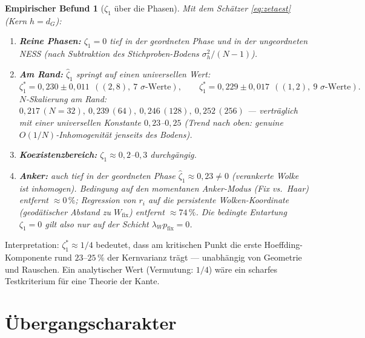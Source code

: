 \documentclass[11pt,a4paper]{article}
\newtheorem{befund}{Empirischer Befund}
\theoremstyle{remark}
\begin{document}
\begin{befund}[$\zeta_1$ über die Phasen]\label{bef:zeta}
Mit dem Schätzer \eqref{eq:zetaest} (Kern $h=d_G$):
\begin{enumerate}
\item \textbf{Reine Phasen:} $\zeta_1=0$ tief in der geordneten Phase und
in der ungeordneten NESS (nach Subtraktion des Stichproben-Bodens
$\sigma_h^2/(N-1)$).
\item \textbf{Am Rand:} $\widehat\zeta_1$ springt auf einen universellen Wert:
\[
\zeta_1^\ast = 0{,}230\pm0{,}011\ \ ((2,8),\ \text{7 }\sigma\text{-Werte}),
\qquad
\zeta_1^\ast = 0{,}229\pm0{,}017\ \ ((1,2),\ \text{9 }\sigma\text{-Werte}).
\]
$N$-Skalierung am Rand: $0{,}217\,(N{=}32),\ 0{,}239\,(64),\ 0{,}246\,(128),\ 0{,}252\,(256)$
--- verträglich mit einer universellen Konstante $0{,}23$--$0{,}25$
(Trend nach oben: genuine $O(1/N)$-Inhomogenität jenseits des Bodens).
\item \textbf{Koexistenzbereich:} $\zeta_1\approx0{,}2$--$0{,}3$ durchgängig.
\item \textbf{Anker:} auch tief in der geordneten Phase
$\widehat\zeta_1\approx0{,}23\neq0$ (verankerte Wolke ist inhomogen).
Bedingung auf den \emph{momentanen} Anker-Modus (Fix vs.\ Haar) entfernt
$\approx0\,\%$; Regression von $r_i$ auf die persistente Wolken-Koordinate
(geodätischer Abstand zu $W_{\mathrm{fix}}$) entfernt $\approx74\,\%$.
Die bedingte Entartung $\zeta_1=0$ gilt also \emph{nur} auf der Schicht
$\lambda_Wp_{\mathrm{fix}}=0$.
\end{enumerate}
\end{befund}

Interpretation: $\zeta_1^\ast\approx1/4$ bedeutet, dass am kritischen Punkt
die erste Hoeffding-Komponente rund $23$--$25\,\%$ der Kernvarianz trägt ---
unabhängig von Geometrie und Rauschen. Ein analytischer Wert (Vermutung:
$1/4$) wäre ein scharfes Testkriterium für eine Theorie der Kante.

\section{Übergangscharakter}
\end{document}
